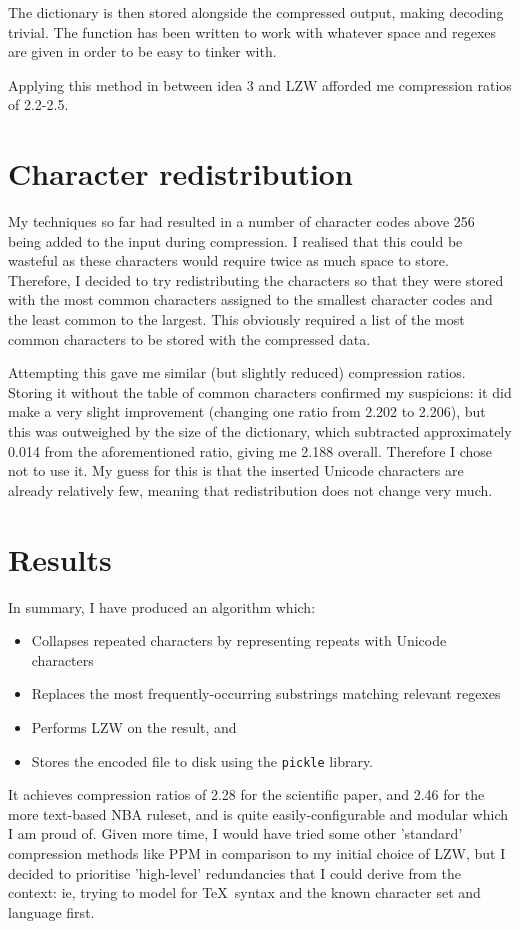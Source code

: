 \documentclass[11pt]{article} %
\begin{document}
The dictionary is then stored alongside the compressed output, making decoding trivial. The function has been written to work with whatever space and regexes are given in order to be easy to tinker with.

Applying this method in between idea 3 and LZW afforded me compression ratios of 2.2-2.5.


\section{Character redistribution}
My techniques so far had resulted in a number of character codes above 256 being added to the input during compression. I realised that this could be wasteful as these characters would require twice as much space to store. Therefore, I decided to try redistributing the characters so that they were stored with the most common characters assigned to the smallest character codes and the least common to the largest. This obviously required a list of the most common characters to be stored with the compressed data.

Attempting this gave me similar (but slightly reduced) compression ratios. Storing it without the table of common characters confirmed my suspicions: it did make a very slight improvement (changing one ratio from 2.202 to 2.206), but this was outweighed by the size of the dictionary, which subtracted approximately 0.014 from the aforementioned ratio, giving me 2.188 overall. Therefore I chose not to use it. My guess for this is that the inserted Unicode characters are already relatively few, meaning that redistribution does not change very much.


\section{Results}
In summary, I have produced an algorithm which:

\begin{itemize}
	\item Collapses repeated characters by representing repeats with Unicode characters
	\item Replaces the most frequently-occurring substrings matching relevant regexes
	\item Performs LZW on the result, and
	\item Stores the encoded file to disk using the \verb|pickle| library.
\end{itemize}

It achieves compression ratios of 2.28 for the scientific paper, and 2.46 for the more text-based NBA ruleset, and is quite easily-configurable and modular which I am proud of. Given more time, I would have tried some other 'standard' compression methods like PPM in comparison to my initial choice of LZW, but I decided to prioritise 'high-level' redundancies that I could derive from the context: ie, trying to model for \rmfamily\TeX\normalfont\ syntax and the known character set and language first.
\end{document}
